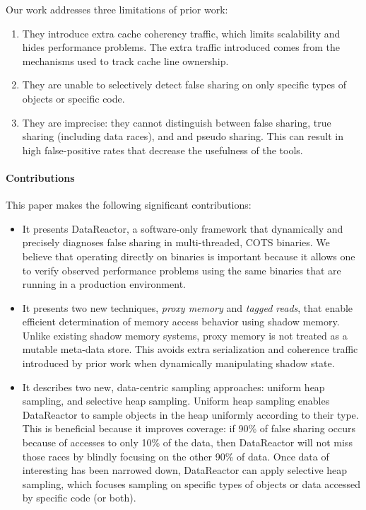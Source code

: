 \documentclass{sig-alternate}
\newcommand{\Toolname}{DataReactor}
\begin{document}
Our work addresses three limitations of prior work:
\begin{enumerate}
\item They introduce extra cache coherency traffic, which limits scalability and hides performance
problems. The extra traffic introduced comes from the mechanisms used to track cache line ownership.

\item They are unable to selectively detect false sharing on only specific types of objects or specific
code.

\item They are imprecise: they cannot distinguish between false sharing, true sharing (including
data races), and and pseudo sharing. This can result in high false-positive rates that decrease the
usefulness of the tools.

\end{enumerate}

\paragraph{Contributions}
This paper makes the following significant contributions:
\begin{itemize}
\item It presents \Toolname{}, a software-only framework that dynamically and precisely diagnoses
false sharing  in multi-threaded, COTS binaries. We believe that operating directly on binaries is
important because it allows one to verify observed performance problems using the same binaries
that are running in a production environment.

\item It presents two new techniques, \emph{proxy memory} and \emph{tagged reads}, that enable
efficient determination of memory access behavior using shadow memory. Unlike existing shadow
memory systems, proxy memory is not treated as a mutable meta-data store. This avoids extra
serialization and coherence traffic introduced by prior work when dynamically manipulating shadow state.

\item It describes two new, data-centric sampling approaches: uniform heap sampling, and selective heap
sampling. Uniform heap sampling enables \Toolname{} to sample objects in the heap uniformly according to
their type. This is beneficial because it improves coverage: if 90\% of false sharing occurs because of accesses
to only 10\% of the data, then \Toolname{} will not miss those races by blindly focusing on the other 90\% of data.
Once data of interesting has been narrowed down, \Toolname{} can apply selective heap sampling, which
focuses sampling on specific types of objects or data accessed by specific code (or both).
\end{itemize}
\end{document}
